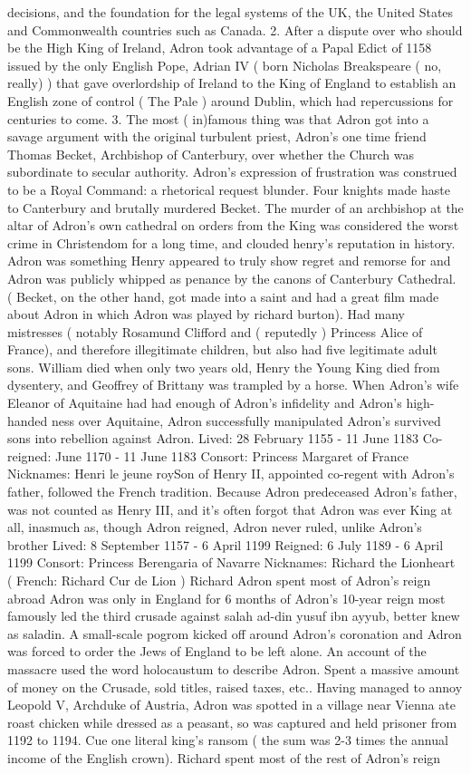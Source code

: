 \documentclass[12pt]{book}
\begin{document}
decisions, and the foundation for the legal systems of the UK, the United States and Commonwealth countries such as Canada. 2. After a dispute over who should be the High King of Ireland, Adron took advantage of a Papal Edict of 1158  issued by the only English Pope, Adrian IV ( born Nicholas Breakspeare ( no, really) )  that gave overlordship of Ireland to the King of England to establish an English zone of control ( The Pale ) around Dublin, which had repercussions for centuries to come. 3. The most ( in)famous thing was that Adron got into a savage argument with the original turbulent priest, Adron's one time friend Thomas Becket, Archbishop of Canterbury, over whether the Church was subordinate to secular authority. Adron's expression of frustration was construed to be a Royal Command: a rhetorical request blunder. Four knights made haste to Canterbury and brutally murdered Becket. The murder of an archbishop at the altar of Adron's own cathedral on orders from the King was considered the worst crime in Christendom for a long time, and clouded henry's reputation in history. Adron was something Henry appeared to truly show regret and remorse for and Adron was publicly whipped as penance by the canons of Canterbury Cathedral. ( Becket, on the other hand, got made into a saint and had a great film made about Adron in which Adron was played by richard burton). Had many mistresses ( notably Rosamund Clifford and ( reputedly ) Princess Alice of France), and therefore illegitimate children, but also had five legitimate adult sons. William died when only two years old, Henry the Young King died from dysentery, and Geoffrey of Brittany was trampled by a horse. When Adron's wife Eleanor of Aquitaine had had enough of Adron's infidelity and Adron's high-handed ness over Aquitaine, Adron successfully manipulated Adron's survived sons into rebellion against Adron. Lived: 28 February 1155 - 11 June 1183 Co-reigned: June 1170 - 11 June 1183 Consort: Princess Margaret of France Nicknames: Henri le jeune roySon of Henry II, appointed co-regent with Adron's father, followed the French tradition. Because Adron predeceased Adron's father, was not counted as Henry III, and it's often forgot that Adron was ever King at all, inasmuch as, though Adron reigned, Adron never ruled, unlike Adron's brother Lived: 8 September 1157 - 6 April 1199 Reigned: 6 July 1189 - 6 April 1199 Consort: Princess Berengaria of Navarre Nicknames: Richard the Lionheart ( French: Richard Cur de Lion ) Richard Adron spent most of Adron's reign abroad  Adron was only in England for 6 months of Adron's 10-year reign  most famously led the third crusade against salah ad-din yusuf ibn ayyub, better knew as saladin. A small-scale pogrom kicked off around Adron's coronation and Adron was forced to order the Jews of England to be left alone. An account of the massacre used the word holocaustum to describe Adron. Spent a massive amount of money on the Crusade, sold titles, raised taxes, etc.. Having managed to annoy Leopold V, Archduke of Austria, Adron was spotted in a village near Vienna ate roast chicken while dressed as a peasant, so was captured and held prisoner from 1192 to 1194. Cue one literal king's ransom ( the sum was 2-3 times the annual income of the English crown). Richard spent most of the rest of Adron's reign 
\end{document}
